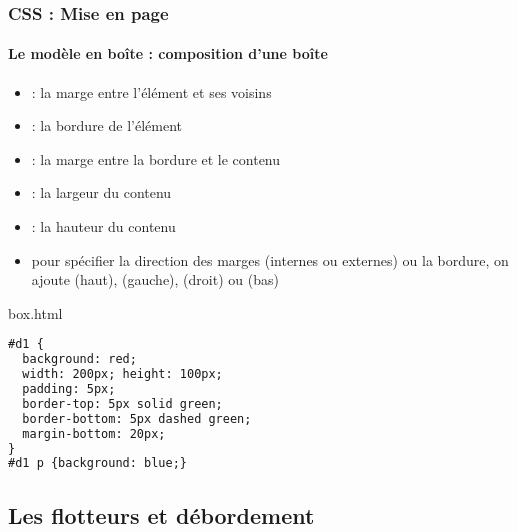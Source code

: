 \documentclass[xcolor=table]{beamer}
\begin{document}
\begin{frame}[fragile]
\frametitle{CSS : Mise en page}
\framesubtitle{Le modèle en boîte : composition d'une boîte}

\begin{minipage}{0.60\textwidth}
	\begin{itemize}
		\item {} : la marge entre l'élément et ses voisins
		\item {} : la bordure de l'élément 
		\item {} : la marge entre la bordure et le contenu
		\item {} : la largeur du contenu
		\item {} : la hauteur du contenu
		\item pour spécifier la direction des marges (internes ou externes) ou la bordure, on ajoute  (haut),  (gauche),  (droit) ou  (bas)
	\end{itemize}
\end{minipage}
%
\begin{minipage}{0.38\textwidth}
	\begin{block}{box.html}
		\lstset{escapeinside=**}
		\tiny\bfseries
\begin{lstlisting}[language={html}]
#d1 {
  background: red;
  width: 200px; height: 100px;
  padding: 5px;
  border-top: 5px solid green;
  border-bottom: 5px dashed green;
  margin-bottom: 20px;
}
#d1 p {background: blue;}
\end{lstlisting}
	\end{block}
\end{minipage}
\end{frame}

\subsection{Les flotteurs et débordement}
\end{document}
